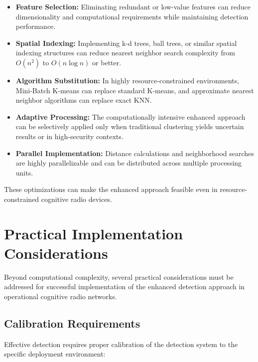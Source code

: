 \begin{itemize}
    \item \textbf{Feature Selection:} Eliminating redundant or low-value features can reduce dimensionality and computational requirements while maintaining detection performance.
    
    \item \textbf{Spatial Indexing:} Implementing k-d trees, ball trees, or similar spatial indexing structures can reduce nearest neighbor search complexity from $O(n^2)$ to $O(n \log n)$ or better.
    
    \item \textbf{Algorithm Substitution:} In highly resource-constrained environments, Mini-Batch K-means can replace standard K-means, and approximate nearest neighbor algorithms can replace exact KNN.
    
    \item \textbf{Adaptive Processing:} The computationally intensive enhanced approach can be selectively applied only when traditional clustering yields uncertain results or in high-security contexts.
    
    \item \textbf{Parallel Implementation:} Distance calculations and neighborhood searches are highly parallelizable and can be distributed across multiple processing units.
\end{itemize}

These optimizations can make the enhanced approach feasible even in resource-constrained cognitive radio devices.

\section{Practical Implementation Considerations}

Beyond computational complexity, several practical considerations must be addressed for successful implementation of the enhanced detection approach in operational cognitive radio networks.

\subsection{Calibration Requirements}

Effective detection requires proper calibration of the detection system to the specific deployment environment:

